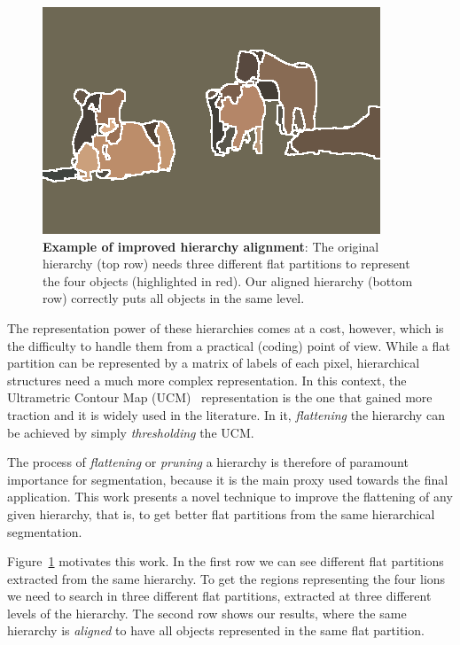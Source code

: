 \begin{figure}
\begin{center}
\begin{minipage}{0.24\linewidth}
\includegraphics[width=\linewidth]{scale-aware/fig/aligned_lions/mcg_our_overseg.png}
\end{minipage}
\end{center}
\vspace{-2mm}
\caption{\textbf{Example of improved hierarchy alignment}: The original hierarchy (top row) needs three
different flat partitions to represent the four objects (highlighted in red).
Our aligned hierarchy (bottom row) correctly puts all objects in the same level.}
\vspace{-2mm}
\label{scale:fig:thresh_seg}
\end{figure}

The representation power of these hierarchies comes at a cost, however, which is the
difficulty to handle them from a practical (coding) point of view.
While a flat partition can be represented by a matrix of labels of each pixel,
hierarchical structures need a much more complex representation. 
In this context, the Ultrametric Contour Map (UCM)~\citep{arbelaez2011contour} representation is the one that 
gained more traction and it is widely used in the literature.
In it, \textit{flattening} the hierarchy can be achieved by simply \textit{thresholding} the UCM.

The process of \textit{flattening} or \textit{pruning} a hierarchy is therefore of paramount importance for
segmentation, because it is the main proxy used towards the final application.
This work presents a novel technique to improve the flattening of any given hierarchy, that is, 
to get better flat partitions from the same hierarchical segmentation.


Figure~\ref{scale:fig:thresh_seg} motivates this work.
In the first row we can see different flat partitions extracted from the same hierarchy.
To get the regions representing the four lions we need to search in three different flat partitions, 
extracted at three different levels of the hierarchy.
The second row shows our results, where the same hierarchy is \textit{aligned} to have all objects represented in the same flat partition.

